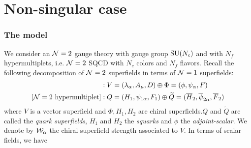 \part{Non-singular case}

\section{The model}

    We consider an $\mathcal{N}=2$ gauge theory with gauge group $\text{SU}(N_c)$ and with $N_f$ hypermultiplets, i.e. $\mathcal{N}=2$ SQCD with $N_c$ colors and $N_f$ flavors. Recall the following decomposition of $\mathcal{N}=2$ superfields in terms of $\mathcal{N}=1$ superfields:
    \begin{align}
        [\mN=2 \text{ vector multiplet}] &: V=(\lambda_\alpha,A_\mu,D)\oplus \Phi=(\phi,\psi_\alpha,F)\\
        [\mN=2 \text{ hypermultiplet}] &: Q=(H_1,\psi_{1\alpha},F_1) \oplus \tilde{Q}=(\bar{H}_2,\bar{\psi}_{2\dalpha},\bar{F}_2)
    \end{align}
    where $V$ is a vector superfield and $\Phi,H_1,H_2$ are chiral superfields.$Q$ and $\tilde{Q}$ are called the \emph{quark superfields}, $H_1$ and $H_2$ the \emph{squarks} and $\phi$ the \emph{adjoint-scalar}. We denote by $\mathcal{W}_\alpha$ the chiral superfield strength associated to $V$. In terms of scalar fields, we have
